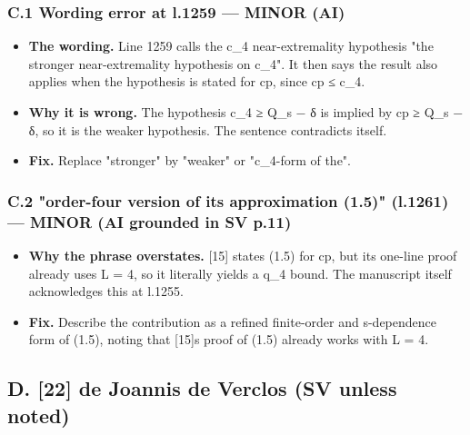 \documentclass[
]{article}
\providecommand{\tightlist}{%
  \setlength{\itemsep}{0pt}\setlength{\parskip}{0pt}}
\begin{document}
\subsubsection{\texorpdfstring{C.1 Wording error at l.1259 ---
\textbf{MINOR}
(AI)}{C.1 Wording error at l.1259 --- MINOR (AI)}}\label{c1-wording-error-at-l1259--minor-ai}

\begin{itemize}
\tightlist
\item
  \textbf{The wording.} Line 1259 calls the c\_4 near-extremality
  hypothesis "the stronger near-extremality hypothesis on c\_4". It then
  says the result also applies when the hypothesis is stated for cp,
  since cp ≤ c\_4.
\item
  \textbf{Why it is wrong.} The hypothesis c\_4 ≥ Q\_s − δ is implied by
  cp ≥ Q\_s − δ, so it is the weaker hypothesis. The sentence
  contradicts itself.
\item
  \textbf{Fix.} Replace "stronger" by "weaker" or "c\_4-form of the".
\end{itemize}

\subsubsection{\texorpdfstring{C.2 "order-four version of its
approximation (1.5)" (l.1261) --- \textbf{MINOR} (AI grounded in SV
p.11)}{C.2 "order-four version of its approximation (1.5)" (l.1261) --- MINOR (AI grounded in SV p.11)}}\label{c2-order-four-version-of-its-approximation-15-l1261--minor-ai-grounded-in-sv-p11}

\begin{itemize}
\tightlist
\item
  \textbf{Why the phrase overstates.} {[}15{]} states (1.5) for cp, but
  its one-line proof already uses L = 4, so it literally yields a q\_4
  bound. The manuscript itself acknowledges this at l.1255.
\item
  \textbf{Fix.} Describe the contribution as a refined finite-order and
  s-dependence form of (1.5), noting that {[}15{]}\textquotesingle s
  proof of (1.5) already works with L = 4.
\end{itemize}

\subsection{D. {[}22{]} de Joannis de Verclos (SV unless
noted)}\label{d-22-de-joannis-de-verclos-sv-unless-noted}
\end{document}
